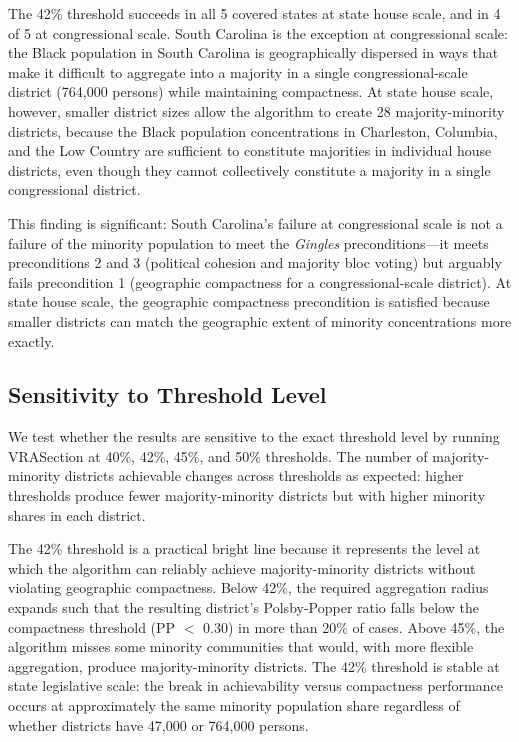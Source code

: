 \noindent The 42\% threshold succeeds in all 5 covered states at state house scale, and in 4 of 5 at congressional scale. South Carolina is the exception at congressional scale: the Black population in South Carolina is geographically dispersed in ways that make it difficult to aggregate into a majority in a single congressional-scale district (764,000 persons) while maintaining compactness. At state house scale, however, smaller district sizes allow the algorithm to create 28 majority-minority districts, because the Black population concentrations in Charleston, Columbia, and the Low Country are sufficient to constitute majorities in individual house districts, even though they cannot collectively constitute a majority in a single congressional district.

This finding is significant: South Carolina's failure at congressional scale is not a failure of the minority population to meet the \textit{Gingles} preconditions---it meets preconditions 2 and 3 (political cohesion and majority bloc voting) but arguably fails precondition 1 (geographic compactness for a congressional-scale district). At state house scale, the geographic compactness precondition is satisfied because smaller districts can match the geographic extent of minority concentrations more exactly.

\subsection{Sensitivity to Threshold Level}

We test whether the results are sensitive to the exact threshold level by running VRASection at 40\%, 42\%, 45\%, and 50\% thresholds. The number of majority-minority districts achievable changes across thresholds as expected: higher thresholds produce fewer majority-minority districts but with higher minority shares in each district.

The 42\% threshold is a practical bright line because it represents the level at which the algorithm can reliably achieve majority-minority districts without violating geographic compactness. Below 42\%, the required aggregation radius expands such that the resulting district's Polsby-Popper ratio falls below the compactness threshold (PP $<$ 0.30) in more than 20\% of cases. Above 45\%, the algorithm misses some minority communities that would, with more flexible aggregation, produce majority-minority districts. The 42\% threshold is stable at state legislative scale: the break in achievability versus compactness performance occurs at approximately the same minority population share regardless of whether districts have 47,000 or 764,000 persons.
